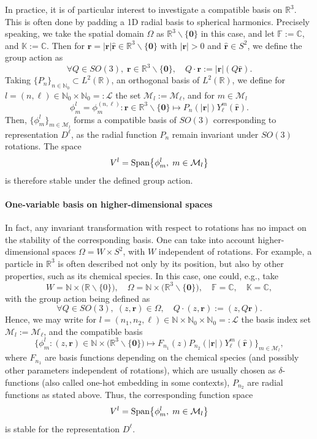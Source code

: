 \documentclass{article}
\numberwithin{equation}{section}
\def\N{\mathbb{N}}
\def\K{\mathbb{K}}
\def\R{\mathbb{R}}
\def\C{\mathbb{C}}
\def\F{\mathbb{F}}
\def\br{{\bm r}}
\def\calM{\mathcal{M}}
\def\calL{\mathcal{L}}
\begin{document}
{In practice, it is of particular interest to investigate a compatible basis on $\R^3$. This is often done by padding a 1D radial basis to spherical harmonics. 
Precisely speaking, we take the spatial domain $\Omega$ as $\R^3\backslash \{\mathbf{0}\}$ in this case, 
and let $\F := \C$, and $\K :=\C$. Then for $\br=|\br|\hat{\br}\in\R^3\backslash\{\mathbf{0}\}$ with $|\br|> 0$ and 
$\hat{\br} \in S^2$, we define the group action as
\[
    \forall Q\in SO(3), \;  \br \in \R^3\backslash\{\mathbf{0}\}, 
    \quad 
    Q \cdot \br := |\br| (Q \hat{\br}).
\]
Taking $\{P_n\}_{n\in\N_0}\subset L^2(\R)$, an orthogonal basis of $L^2(\R)$, we
define for $l=(n,\ell)\in\N_0\times\N_0=:\calL$ the set $\calM_l := \calM_\ell$, and for $m\in \calM_l$ 
\[
    \phi^l_m=\phi^{(n,\ell)}_m : \br \in \R^3\backslash\{\mathbf{0}\}  \mapsto P_n(|\br|)Y_\ell^m(\hat{\br}).
\]
Then, $\big\{\phi^l_m \big\}_{m\in\calM_l}$
forms a compatible basis of $SO(3)$ corresponding to representation $D^\ell$, as the radial function $P_n$ remain invariant under $SO(3)$ rotations. The space
\[
    V^{l} = \textup{Span}\big\{ \phi^l_m, \; 
    m\in\calM_l \big\}
\]
is therefore stable under the defined group action. 

\paragraph{One-variable basis on higher-dimensional spaces}

In fact, any invariant transformation with respect to rotations 
has no impact on the stability of the corresponding basis. One can take into account higher-dimensional spaces $\Omega = W \times S^2$, with $W$ independent of rotations. 
For example, a particle in $\R^3$ is often described not only by its position, but also by other properties, such as its chemical species. In this case, one could, e.g., take 
\[
    W = \N\times\big(\R\backslash\{0\}\big), \quad \Omega = \N \times \big(\R^3\backslash\{\mathbf{0}\}\big), \quad \F = \C, \quad \K = \C,
\]
with the group action being defined as 
\[
    \forall Q \in SO(3),\; (z,\br) \in \Omega, 
    \quad Q \cdot (z,\br) := 
    (z,Q\br).
\]
Hence, we may write for $l=(n_1,n_2,\ell)\in \N \times \N_0 \times \N_0=:\calL$ the basis index set $\calM_l:=\calM_\ell$, and the compatible basis 
\[
    \{\phi^l_m: (z,\br)
    \in \N \times \big(\R^3\backslash\{\mathbf{0}\}\big) \mapsto F_{n_1}(z)P_{n_2}(|\br|)Y_\ell^m(\hat\br)\}_{m\in\calM_l},
\]
where $F_{n_1}$ are basis functions depending on the chemical species (and possibly other parameters independent of rotations),
which are usually chosen as $\delta$-functions (also called one-hot embedding in some contexts),
$P_{n_2}$ are radial functions as stated above. 
Thus, the
corresponding function space
\[
    V^l = \textup{Span}
    \big\{\phi^l_m, \; m\in\calM_l \big\}
\]
is stable for the representation $D^\ell$. 

}
\end{document}
